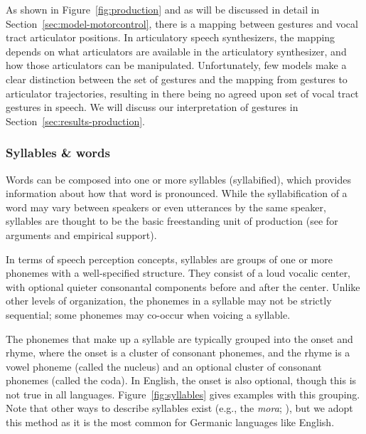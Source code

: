 As shown in Figure~\ref{fig:production}
and as will be discussed in detail
in Section~\ref{sec:model-motorcontrol},
there is a mapping
between gestures and
vocal tract articulator positions.
In articulatory speech synthesizers,
the mapping depends on what articulators
are available in the articulatory synthesizer,
and how those articulators can be manipulated.
Unfortunately, few models make a clear distinction
between the set of gestures
and the mapping from gestures
to articulator trajectories,
resulting in there being
no agreed upon set of vocal tract gestures
in speech.
We will discuss our interpretation
of gestures in Section~\ref{sec:results-production}.

\subsubsection{Syllables \& words}
\label{sec:syll-words}

Words can be composed into one or more syllables
(syllabified),
which provides information about
how that word is pronounced.
While the syllabification of a word
may vary between speakers
or even utterances by the same speaker,
syllables are thought to be the
basic freestanding unit of production
(see \citealt{levelt1994,levelt1999,cholin2004}
for arguments and empirical support).

In terms of speech perception concepts,
syllables are groups of one or more phonemes
with a well-specified structure.
They consist of a loud vocalic center,
with optional quieter consonantal components
before and after the center.
Unlike other levels of organization,
the phonemes in a syllable
may not be strictly sequential;
some phonemes may co-occur
when voicing a syllable.

The phonemes that make up a syllable
are typically grouped into
the onset and rhyme,
where the onset is a cluster of
consonant phonemes,
and the rhyme is a vowel phoneme
(called the nucleus)
and an optional cluster of consonant
phonemes (called the coda).
In English, the onset is also optional,
though this is not true in all languages.
Figure~\ref{fig:syllables} gives
examples with this grouping.
Note that other ways to describe
syllables exist
(e.g., the \textit{mora}; \citealt{otake1993}),
but we adopt this method
as it is the most common
for Germanic languages like English.


